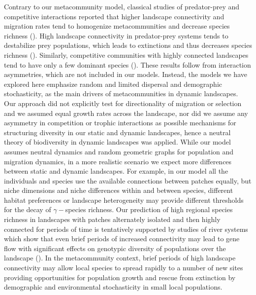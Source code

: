 \documentclass[12pt]{article}
\begin{document}
    Contrary to our metacommunity model, classical studies of predator-prey and competitive interactions reported that higher landscape connectivity and migration rates tend to homogenize metacommunities and decrease species richness (\cite{ellneretal2001, foxetal2011}). High landscape connectivity in predator-prey systems tends to destabilize prey populations, which leads to extinctions and thus decreases species richness (\cite{ellneretal2001, foxetal2011}). Similarly, competitive communities with highly connected landscapes tend to have only a few dominant species (\cite{Holyoaketal2005}). These results follow from interaction asymmetries, which are not included in our models. Instead, the models we have explored here emphasize random and limited dispersal and demographic stochasticity, as the main drivers of metacommunities in dynamic landscapes. Our approach did not explicitly test for directionality of migration or selection and we assumed equal growth rates across the landscape, nor did we assume any asymmetry in competition or trophic interactions as possible mechanisms for structuring diversity in our static and dynamic landscapes, hence a neutral theory of biodiversity in dynamic landscapes was applied. While our model assumes neutral dynamics and random geometric graphs for population and migration dynamics, in a more realistic scenario we expect more differences between static and dynamic landscapes. For example, in our model all the individuals and species use the available connections between patches equally, but niche dimensions and niche differences within and between species, different habitat preferences or landscape heterogeneity may provide different thresholds for the decay of $\gamma-$species richness. Our prediction of high regional species richness in landscapes with patches alternately isolated and then highly connected for periods of time is tentatively supported by studies of river systems which show that even brief periods of increased connectivity may lead to gene flow with significant effects on genotypic diversity of populations over the landscape (\cite{BoizardEtAl2009}). In the metacommunity context, brief periods of high landscape connectivity may allow local species to spread rapidly to a number of new sites providing opportunities for population growth and rescue from extinction by demographic and environmental stochasticity in small local populations.
    
\end{document}
